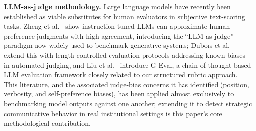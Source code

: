\documentclass[conference]{IEEEtran}
\begin{document}
\textbf{LLM-as-judge methodology.} Large language models have recently been established as viable substitutes for human evaluators in subjective text-scoring tasks. Zheng et al.~\cite{zheng2023judging} show instruction-tuned LLMs can approximate human preference judgments with high agreement, introducing the ``LLM-as-judge'' paradigm now widely used to benchmark generative systems; Dubois et al.~\cite{dubois2024length} extend this with length-controlled evaluation protocols addressing known biases in automated judging, and Liu et al.~\cite{liu2023geval} introduce G-Eval, a chain-of-thought-based LLM evaluation framework closely related to our structured rubric approach. This literature, and the associated judge-bias concerns it has identified (position, verbosity, and self-preference biases), has been applied almost exclusively to benchmarking model outputs against one another; extending it to detect strategic communicative behavior in real institutional settings is this paper's core methodological contribution.
\end{document}
